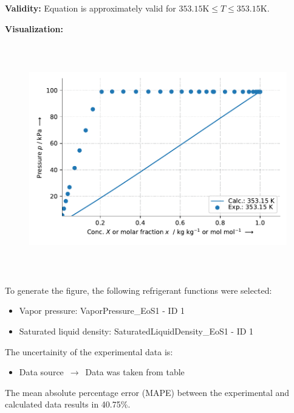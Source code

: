 \textbf{Validity:}
\newline
Equation is approximately valid for $353.15 \si{\kelvin} \leq T \leq 353.15 \si{\kelvin}$.
\newline

\textbf{Visualization:}
%
\begin{figure}[!htp]
{\noindent\includegraphics[height=10cm, keepaspectratio]{figs/abs/abs_Cyclohexane_inoic_liquid_[BMIM]+[(CF3SO2)2N]-_NrtlTemperatureDg_1.pdf}}
\end{figure}
%

To generate the figure, the following refrigerant functions were selected:
\begin{itemize}
\item Vapor pressure: VaporPressure\_EoS1 - ID 1
\item Saturated liquid density: SaturatedLiquidDensity\_EoS1 - ID 1
\end{itemize}

The uncertainity of the experimental data is:
\begin{itemize}
\item Data source $\,\to\,$ Data was taken from table
\end{itemize}

The mean absolute percentage error (MAPE) between the experimental and calculated data results in 40.75\%.
\FloatBarrier
\newpage
